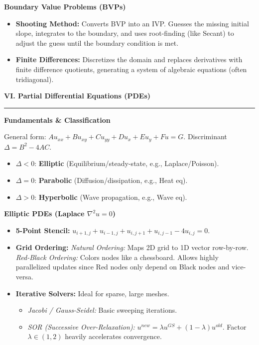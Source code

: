 \documentclass[10pt, landscape, twocolumn]{article}
\newcommand{\cheatsheetsection}[1]{
    \vspace{0.6em}
    {\color{themeblue}\large\bfseries #1} \par
    \vspace{-0.5em}
    {\color{themeblue}\rule{\linewidth}{1pt}} \par
    \vspace{0.2em}
}
\newcommand{\cheatsheetsubsection}[1]{
    \vspace{0.4em}
    {\color{themeblue}\normalsize\bfseries #1} \par
    \vspace{0.1em}
}
\begin{document}
\cheatsheetsubsection{Boundary Value Problems (BVPs)}
\begin{itemize}[leftmargin=*, nosep]
    \item \textbf{Shooting Method:} Converts BVP into an IVP. Guesses the missing initial slope, integrates to the boundary, and uses root-finding (like Secant) to adjust the guess until the boundary condition is met.
    \item \textbf{Finite Differences:} Discretizes the domain and replaces derivatives with finite difference quotients, generating a system of algebraic equations (often tridiagonal).
\end{itemize}

\cheatsheetsection{VI. Partial Differential Equations (PDEs)}

\cheatsheetsubsection{Fundamentals \& Classification}
General form: $Au_{xx} + Bu_{xy} + Cu_{yy} + Du_x + Eu_y + Fu = G$.
Discriminant $\Delta = B^2 - 4AC$.
\begin{itemize}[leftmargin=*, nosep]
    \item $\Delta < 0$: \textbf{Elliptic} (Equilibrium/steady-state, e.g., Laplace/Poisson).
    \item $\Delta = 0$: \textbf{Parabolic} (Diffusion/dissipation, e.g., Heat eq).
    \item $\Delta > 0$: \textbf{Hyperbolic} (Wave propagation, e.g., Wave eq).
\end{itemize}

\cheatsheetsubsection{Elliptic PDEs (Laplace $\nabla^2 u = 0$)}
\begin{itemize}[leftmargin=*, nosep]
    \item \textbf{5-Point Stencil:} $u_{i+1,j} + u_{i-1,j} + u_{i,j+1} + u_{i,j-1} - 4u_{i,j} = 0$.
    \item \textbf{Grid Ordering:} 
    \textit{Natural Ordering:} Maps 2D grid to 1D vector row-by-row.
    \textit{Red-Black Ordering:} Colors nodes like a chessboard. Allows highly parallelized updates since Red nodes only depend on Black nodes and vice-versa.
    \item \textbf{Iterative Solvers:} Ideal for sparse, large meshes.
    \begin{itemize}[leftmargin=*, nosep]
        \item \textit{Jacobi / Gauss-Seidel:} Basic sweeping iterations.
        \item \textit{SOR (Successive Over-Relaxation):} $u^{new} = \lambda u^{GS} + (1-\lambda)u^{old}$. Factor $\lambda \in (1,2)$ heavily accelerates convergence.
    \end{itemize}
\end{itemize}
\end{document}
